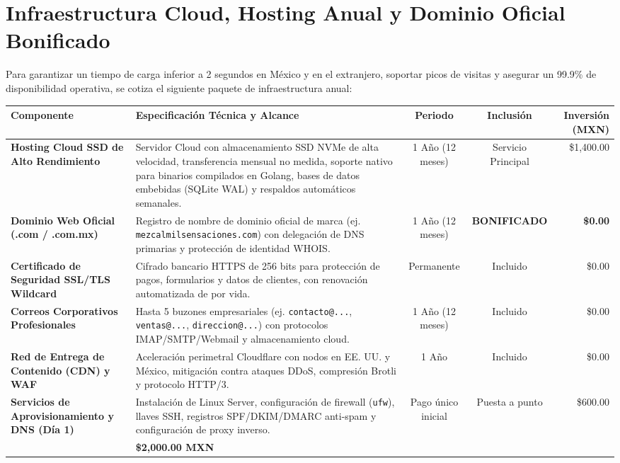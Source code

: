 \documentclass[11pt,letterpaper]{article}
\begin{document}
\clearpage

\section{Infraestructura Cloud, Hosting Anual y Dominio Oficial Bonificado}

Para garantizar un tiempo de carga inferior a 2 segundos en México y en el extranjero, soportar picos de visitas y asegurar un 99.9\% de disponibilidad operativa, se cotiza el siguiente paquete de infraestructura anual:

\vspace{0.15cm}

\noindent
\footnotesize
\begin{tabularx}{\textwidth}{>{\bfseries}p{3.6cm} X c c r}
\toprule
\rowcolor{MezcalAgave!15}
Componente & Especificación Técnica y Alcance & Periodo & Inclusión & Inversión (MXN) \\
\midrule
Hosting Cloud SSD de Alto Rendimiento & 
Servidor Cloud con almacenamiento SSD NVMe de alta velocidad, transferencia mensual no medida, soporte nativo para binarios compilados en Golang, bases de datos embebidas (SQLite WAL) y respaldos automáticos semanales. & 
1 Año (12 meses) & 
Servicio Principal & 
\$1,400.00 \\
\midrule
Dominio Web Oficial (.com / .com.mx) & 
Registro de nombre de dominio oficial de marca (ej. \texttt{mezcalmilsensaciones.com}) con delegación de DNS primarias y protección de identidad WHOIS. & 
1 Año (12 meses) & 
\textbf{BONIFICADO} & 
\textbf{\$0.00} \\
\midrule
Certificado de Seguridad SSL/TLS Wildcard & 
Cifrado bancario HTTPS de 256 bits para protección de pagos, formularios y datos de clientes, con renovación automatizada de por vida. & 
Permanente & 
Incluido & 
\$0.00 \\
\midrule
Correos Corporativos Profesionales & 
Hasta 5 buzones empresariales (ej. \texttt{contacto@...}, \texttt{ventas@...}, \texttt{direccion@...}) con protocolos IMAP/SMTP/Webmail y almacenamiento cloud. & 
1 Año (12 meses) & 
Incluido & 
\$0.00 \\
\midrule
Red de Entrega de Contenido (CDN) y WAF & 
Aceleración perimetral Cloudflare con nodos en EE. UU. y México, mitigación contra ataques DDoS, compresión Brotli y protocolo HTTP/3. & 
1 Año & 
Incluido & 
\$0.00 \\
\midrule
Servicios de Aprovisionamiento y DNS (Día 1) & 
Instalación de Linux Server, configuración de firewall (\texttt{ufw}), llaves SSH, registros SPF/DKIM/DMARC anti-spam y configuración de proxy inverso. & 
Pago único inicial & 
Puesta a punto & 
\$600.00 \\
\midrule
\rowcolor{MezcalGold!20}
\multicolumn{4}{l}{\textbf{TOTAL DE LA FASE INICIAL DE INFRAESTRUCTURA (PAGO INICIAL DÍA 1):}} & \textbf{\$2,000.00 MXN} \\
\bottomrule
\end{tabularx}
\end{document}
